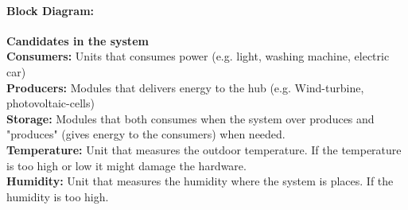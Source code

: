 			\paragraph{Block Diagram:}
				\textbf{Candidates in the system}
				\\\textbf{Consumers:} Units that consumes power (e.g. light, washing machine, electric car)
				\\\textbf{Producers:} Modules that delivers energy to the hub (e.g. Wind-turbine, photovoltaic-cells)
				\\\textbf{Storage:} Modules that both consumes when the system over produces and "produces" (gives energy to the consumers) when needed. 
				\\\textbf{Temperature:} Unit that measures the outdoor temperature. If the temperature is too high or low it might damage the hardware.
				\\\textbf{Humidity:} Unit that measures the humidity where the system is places. If the humidity is too high.
				\newline
